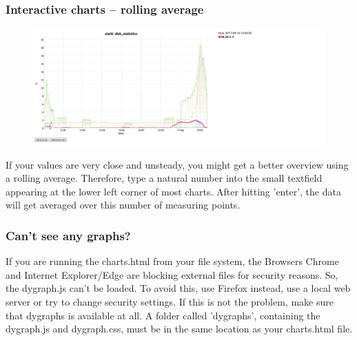 \documentclass[8pt]{beamer}
\begin{document}
\begin{frame}
\frametitle{Interactive charts -- rolling average} 
\begin{figure}
	\includegraphics[width=\textwidth]{../images/PicDat_roller.png}
\end{figure}

If your values are very close and unsteady, you might get a better overview using a rolling average. Therefore, type a natural number into the small textfield appearing at the lower left corner of most charts. After hitting 'enter', the data will get averaged over this number of measuring points.
\end{frame}

\begin{frame}
\frametitle{Can't see any graphs?}
If you are running the charts.html from your file system, the Browsers Chrome and Internet Explorer/Edge are blocking external files for security reasons. So, the dygraph.js can't be loaded. To avoid this, use Firefox instead, use a local web server or try to change security settings.
If this is not the problem, make sure that dygraphs is available at all. A folder called 'dygraphs', containing the dygraph.js and dygraph.css, must be in the same location as your charts.html file.
\end{frame}
\end{document}

